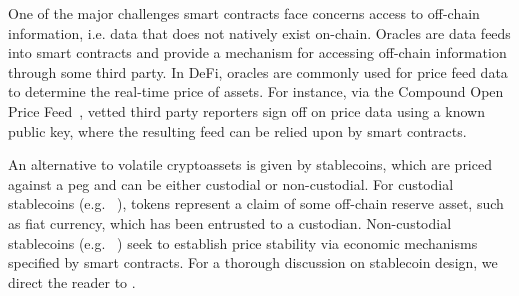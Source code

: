One of the major challenges smart contracts face concerns access to off-chain information, i.e. data that does not natively exist on-chain.
Oracles are data feeds into smart contracts and provide a mechanism for accessing off-chain information through some third party.
In DeFi, oracles are commonly used for price feed data to determine the real-time price of assets.
For instance, via the Compound Open Price Feed~\cite{web:compoundfinance_prices}, vetted third party reporters sign off on price data using a known public key, where the resulting feed can be relied upon by smart contracts.

An alternative to volatile cryptoassets is given by stablecoins, which are priced against a peg and can be either custodial or non-custodial.
For custodial stablecoins (e.g. ~\cite{web:usdc}), tokens represent a claim of some off-chain reserve asset, such as fiat currency, which has been entrusted to a custodian.
Non-custodial stablecoins (e.g. ~\cite{whitepaper:maker}) seek to establish price stability via economic mechanisms specified by smart contracts.
For a thorough discussion on stablecoin design, we direct the reader to \cite{Klages-Mundt2020}.
